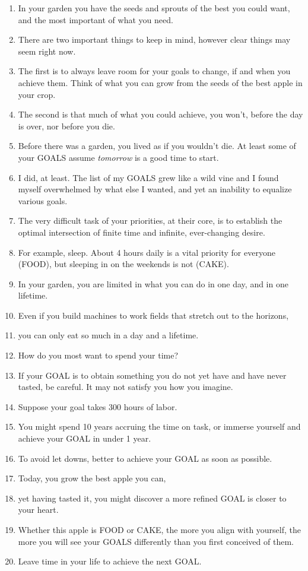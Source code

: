 \documentclass[
]{book}
\providecommand{\tightlist}{%
  \setlength{\itemsep}{0pt}\setlength{\parskip}{0pt}}
\begin{document}
\begin{enumerate}
\def\labelenumi{\arabic{enumi}.}
\tightlist
\item
  In your garden you have the seeds and sprouts of the best you could want, and the most important of what you need.
\item
  There are two important things to keep in mind, however clear things may seem right now.\\
\item
  The first is to always leave room for your goals to change, if and when you achieve them. Think of what you can grow from the seeds of the best apple in your crop.
\item
  The second is that much of what you could achieve, you won't, before the day is over, nor before you die.
\item
  Before there was a garden, you lived as if you wouldn't die. At least some of your GOALS assume \emph{tomorrow} is a good time to start.\\
\item
  I did, at least. The list of my GOALS grew like a wild vine and I found myself
  overwhelmed by what else I wanted, and yet an inability to equalize various
  goals.
\item
  The very difficult task of your priorities, at their core, is to establish the optimal intersection of finite time and infinite, ever-changing desire.
\item
  For example, sleep. About 4 hours daily is a vital priority for everyone (FOOD), but sleeping in on the weekends is not (CAKE).
\item
  In your garden, you are limited in what you can do in one day, and in one lifetime.
\item
  Even if you build machines to work fields that stretch out to the horizons,
\item
  you can only eat so much in a day and a lifetime.
\item
  How do you most want to spend your time?
\item
  If your GOAL is to obtain something you do not yet have and have never
  tasted, be careful. It may not satisfy you how you imagine.
\item
  Suppose your goal takes 300 hours of labor.
\item
  You might spend 10 years accruing the time on task, or immerse yourself
  and achieve your GOAL in under 1 year.
\item
  To avoid let downs, better to achieve your GOAL as soon as possible.
\item
  Today, you grow the best apple you can,
\item
  yet having tasted it, you might discover a more refined GOAL is closer to
  your heart.
\item
  Whether this apple is FOOD or CAKE, the more you align with yourself, the
  more you will see your GOALS differently than you first conceived of them.
\item
  Leave time in your life to achieve the next GOAL.
\end{enumerate}
\end{document}
